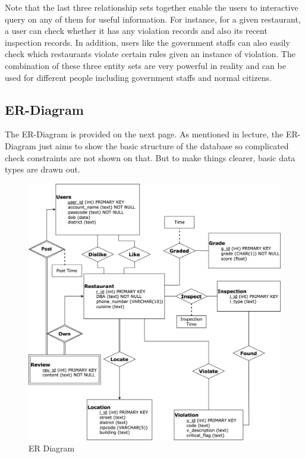 \documentclass[a4paper,12pt]{article}
\theoremstyle{definition}
\begin{document}
Note that the last three relationship sets together enable the users to interactive query on any of them for useful information. For instance, for a given restaurant, a user can check whether it has any violation records and also its recent inspection records. In addition, users like the government staffs can also easily check which restaurants violate certain rules given an instance of violation. The combination of these three entity sets are very powerful in reality and can be used for different people including government staffs and normal citizens.

\subsection{ER-Diagram}
The ER-Diagram is provided on the next page. As mentioned in lecture, the ER-Diagram just aims to show the basic structure of the database so complicated check constraints are not shown on that. But to make things clearer, basic data types are drawn out.


\begin{figure}
    \centering
    \includegraphics[scale = 0.75]{Project1_ER.png}
    \caption{ER Diagram}
    \label{fig:er}
\end{figure}

\newpage
\end{document}
